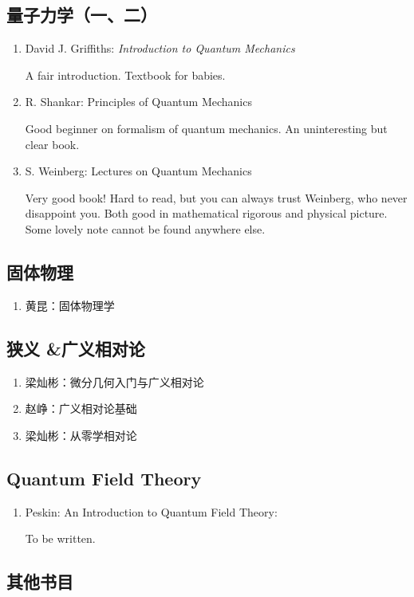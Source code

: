 \subsection*{量子力学（一、二）}

\begin{enumerate}
  \item David J. Griffiths: \textit{Introduction to Quantum Mechanics}

  A fair introduction. Textbook for babies.
  \item R. Shankar: Principles of Quantum Mechanics

  Good beginner on formalism of quantum mechanics. An uninteresting but clear book.

  \item S. Weinberg: Lectures on Quantum Mechanics

  Very good book! Hard to read, but you can always trust Weinberg, who never disappoint you. Both good in mathematical rigorous and physical picture. Some lovely note cannot be found anywhere else.
\end{enumerate}

\subsection*{固体物理}

\begin{enumerate}
  \item 黄昆：固体物理学
\end{enumerate}

\subsection*{狭义 \&广义相对论}

\begin{enumerate}
  \item 梁灿彬：微分几何入门与广义相对论
  \item 赵峥：广义相对论基础
  \item 梁灿彬：从零学相对论
\end{enumerate}


\subsection*{Quantum Field Theory}

\begin{enumerate}
  \item Peskin: An Introduction to Quantum Field Theory:

  To be written.
\end{enumerate}


\subsection*{其他书目}




